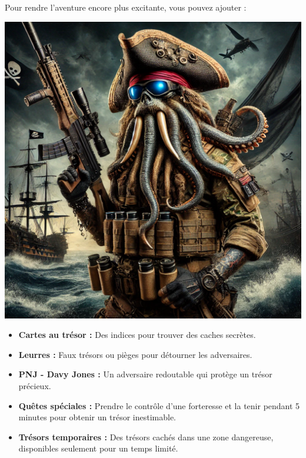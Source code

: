 \documentclass{pirategame}
\begin{document}
Pour rendre l'aventure encore plus excitante, vous pouvez ajouter :

\begin{minipage}[t]{0.28\textwidth}
  \textwidth %
  \vspace{0em}
  \includegraphics[width=\linewidth]{img/davy-jones.png} %
\end{minipage}
\hfill
\begin{minipage}[t]{0.7\textwidth}
  \begin{itemize}[series=extension]
      \item \textbf{Cartes au trésor :} Des indices pour trouver des caches secrètes.
      \item \textbf{Leurres :} Faux trésors ou pièges pour détourner les adversaires.
      \item \textbf{PNJ - Davy Jones :} Un adversaire redoutable qui protège un trésor précieux.
      \item \textbf{Quêtes spéciales :} Prendre le contrôle d’une forteresse et la tenir pendant 5 minutes pour obtenir un trésor inestimable.
      \item \textbf{Trésors temporaires :} Des trésors cachés dans une zone dangereuse, disponibles seulement pour un temps limité.
  \end{itemize}
\end{minipage}
\end{document}
